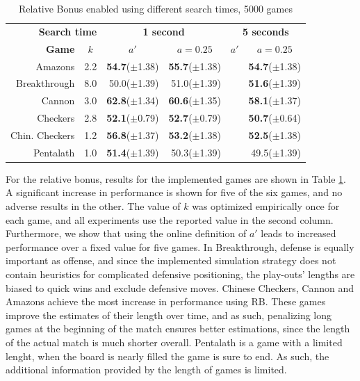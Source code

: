 \documentclass{ecai2014}
\begin{document}
\begin{table}
{\caption{Relative Bonus enabled using different search times, 5000 games} \label{tab:rb}}
\begin{center}
\begin{tabular}{rlrrrr}
\hline
\multicolumn{2}{r}{\rule{0pt}{12pt}\textbf{Search time}} & \multicolumn{2}{c}{\textbf{1 second}} & \multicolumn{2}{c}{\textbf{5 seconds}} \\
\cline{1-6}
\rule{0pt}{12pt}
\textbf{Game} & \multicolumn{1}{c|}{\textbf{$k$}} 
& \multicolumn{1}{c}{\textbf{$a'$}} & \multicolumn{1}{c}{\textbf{$a = 0.25$}} & \multicolumn{1}{c}{\textbf{$a'$}} & \multicolumn{1}{c}{\textbf{$a = 0.25$}} \\ \hline
Amazons &\multicolumn{1}{l|}{2.2}			& {\bf{54.7}}($\pm$1.38) & {\bf{55.7}}($\pm$1.38) 	& & {\bf{54.7}}($\pm$1.38) \\ 
Breakthrough &\multicolumn{1}{l|}{8.0} 		& 50.0($\pm$1.39)		 & 51.0($\pm$1.39) 			& & {\bf{51.6}}($\pm$1.39) \\ 
Cannon &\multicolumn{1}{l|}{3.0} 			& {\bf{62.8}}($\pm$1.34) & {\bf{60.6}}($\pm$1.35) 	& & {\bf{58.1}}($\pm$1.37) \\ 
Checkers &\multicolumn{1}{l|}{2.8}			& {\bf{52.1}}($\pm$0.79) & {\bf{52.7}}($\pm$0.79) 	& & {\bf{50.7}}($\pm$0.64) \\ 
Chin. Checkers &\multicolumn{1}{l|}{1.2} 	& {\bf{56.8}}($\pm$1.37) & {\bf{53.2}}($\pm$1.38) 	& & {\bf{52.5}}($\pm$1.38) \\
Pentalath &\multicolumn{1}{l|}{1.0} 		& {\bf{51.4}}($\pm$1.39) & 50.3($\pm$1.39) 			& & 49.5($\pm$1.39) \\
\hline
\end{tabular}
\end{center}
\end{table}
For the relative bonus, results for the implemented games are shown in Table \ref{tab:rb}. A significant increase in performance is shown for five of the six games, and no adverse results in the other. The value of $k$ was optimized empirically once for each game, and all experiments use the reported value in the second column. Furthermore, we show that using the online definition of $a'$ leads to increased performance over a fixed value for five games. In Breakthrough, defense is equally important as offense, and since the implemented simulation strategy does not contain heuristics for complicated defensive positioning, the play-outs' lengths are biased to quick wins and exclude defensive moves.
Chinese Checkers, Cannon and Amazons achieve the most increase in performance using RB. These games improve the estimates of their length over time, and as such, penalizing long games at the beginning of the match ensures better estimations, since the length of the actual match is much shorter overall. Pentalath is a game with a limited lenght, when the board is nearly filled the game is sure to end. As such, the additional information provided by the length of games is limited.
\end{document}
